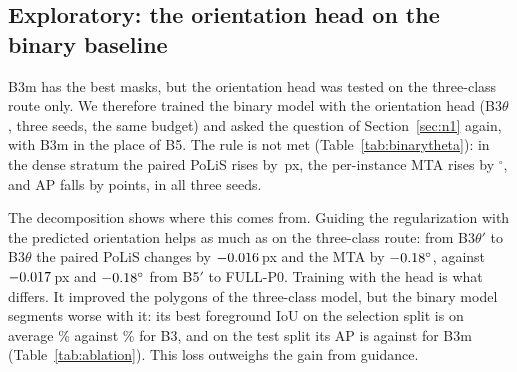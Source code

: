 \documentclass[conference]{IEEEtran}
\newcommand{\fittable}[1]{\resizebox{\ifdim\width>\textwidth\textwidth\else\width\fi}{!}{#1}}
\begin{document}
\subsection{Exploratory: the orientation head on the binary baseline}
\label{sec:binarytheta}
\begin{table}[t]
\centering
\caption{Orientation head on the binary route: paired differences in the dense stratum of the test split (\NTilesDense{}
tiles, three seeds), with 95\% bootstrap intervals. B3$\theta'$ and B3$\theta$ share one network; the first is
regularized with minimum-area rectangles, the second with the predicted orientation.}
\label{tab:binarytheta}
\footnotesize\fittable{}
\end{table}
B3m has the best masks, but the orientation head was tested on the three-class route only. We therefore trained the
binary model with the orientation head (B3$\theta$, three seeds, the same budget) and asked the question of
Section~\ref{sec:n1} again, with B3m in the place of B5. The rule is not met (Table~\ref{tab:binarytheta}): in the dense
stratum the paired PoLiS rises by \NBinThetaTotalPolisAbs\,px, the per-instance MTA rises by
\NBinThetaTotalMtaAbs$^\circ$, and AP falls by \NBinThetaTotalApAbs{} points, in all three seeds.

The decomposition shows where this comes from. Guiding the regularization with the predicted orientation helps as much
as on the three-class route: from B3$\theta'$ to B3$\theta$ the paired PoLiS changes by $-0.016$\,px and
the MTA by $-0.18^\circ$, against $-0.017$\,px and $-0.18^\circ$ from B5$'$ to FULL-P0.
Training with the head is what differs. It improved the polygons of the three-class model, but the binary model
segments worse with it: its best foreground IoU on the selection split is on average \NFgIouBthreet\% against
\NFgIouBthree\% for B3, and on the test split its AP is \NApBthreet{} against \NApBthreem{} for B3m (Table~\ref{tab:ablation}). This loss
outweighs the gain from guidance.
\end{document}

